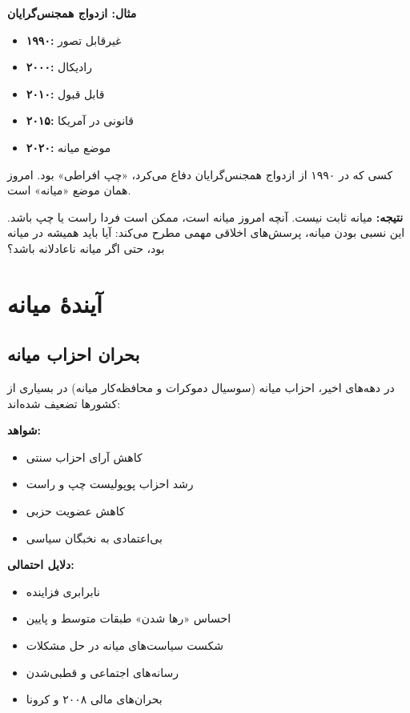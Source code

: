 \textbf{مثال: ازدواج همجنس‌گرایان}

\begin{itemize}
    \item \textbf{۱۹۹۰:} غیرقابل تصور
    \item \textbf{۲۰۰۰:} رادیکال
    \item \textbf{۲۰۱۰:} قابل قبول
    \item \textbf{۲۰۱۵:} قانونی در آمریکا
    \item \textbf{۲۰۲۰:} موضع میانه
\end{itemize}

کسی که در ۱۹۹۰ از ازدواج همجنس‌گرایان دفاع می‌کرد، «چپ افراطی» بود. امروز همان موضع «میانه» است.

\textbf{نتیجه:} میانه ثابت نیست. آنچه امروز میانه است، ممکن است فردا راست یا چپ باشد. این نسبی بودن میانه، پرسش‌های اخلاقی مهمی مطرح می‌کند: آیا باید همیشه در میانه بود، حتی اگر میانه ناعادلانه باشد؟


\section{آیندهٔ میانه}

\subsection{بحران احزاب میانه}


در دهه‌های اخیر، احزاب میانه (سوسیال دموکرات و محافظه‌کار میانه) در بسیاری از کشورها تضعیف شده‌اند:

\textbf{شواهد:}
\begin{itemize}
    \item کاهش آرای احزاب سنتی
    \item رشد احزاب پوپولیست چپ و راست
    \item کاهش عضویت حزبی
    \item بی‌اعتمادی به نخبگان سیاسی
\end{itemize}

\textbf{دلایل احتمالی:}
\begin{itemize}
    \item نابرابری فزاینده
    \item احساس «رها شدن» طبقات متوسط و پایین
    \item شکست سیاست‌های میانه در حل مشکلات
    \item رسانه‌های اجتماعی و قطبی‌شدن
    \item بحران‌های مالی ۲۰۰۸ و کرونا
\end{itemize}


